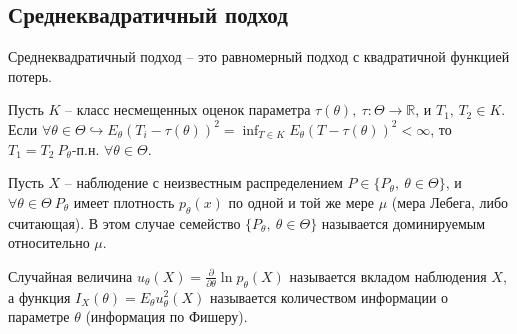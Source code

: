 \subsection{Среднеквадратичный подход}
\begin{definition}
Среднеквадратичный подход -- это равномерный подход с квадратичной функцией потерь.
\end{definition}
\begin{exercise}
Пусть $\displaystyle K$ -- класс несмещенных оценок параметра $\displaystyle \tau ( \theta ),\ \tau :\Theta \rightarrow \mathbb{R}$, и $\displaystyle T_{1},\, T_{2} \in K$. Если $\displaystyle \forall \theta \in \Theta \hookrightarrow E_{\theta }( T_{i} -\tau ( \theta ))^{2} =\inf_{T\in K} E_{\theta }( T-\tau ( \theta ))^{2} < \infty $, то $\displaystyle T_{1} =T_{2} \ P_{\theta }$-п.н. $\displaystyle \forall \theta \in \Theta $.
\end{exercise}
\begin{definition}
Пусть $\displaystyle X$ -- наблюдение с неизвестным распределением $\displaystyle P\in \{P_{\theta },\ \theta \in \Theta \}$, и $\displaystyle \forall \theta \in \Theta\ P_{\theta }$ имеет плотность $\displaystyle p_{\theta }( x)$ по одной и той же мере $\displaystyle \mu $ (мера Лебега, либо считающая). В этом случае семейство $\displaystyle \{P_{\theta },\ \theta \in \Theta \}$ называется доминируемым относительно $\displaystyle \mu $.
\end{definition}
\begin{definition}
Случайная величина $\displaystyle u_{\theta }( X) =\frac{\partial }{\partial \theta }\ln p_{\theta }( X)$ называется вкладом наблюдения $\displaystyle X$, а функция $\displaystyle I_{X}( \theta ) =E_{\theta } u_{\theta }^{2}( X)$ называется количеством информации о параметре $\displaystyle \theta $ (информация по Фишеру).
\end{definition}

